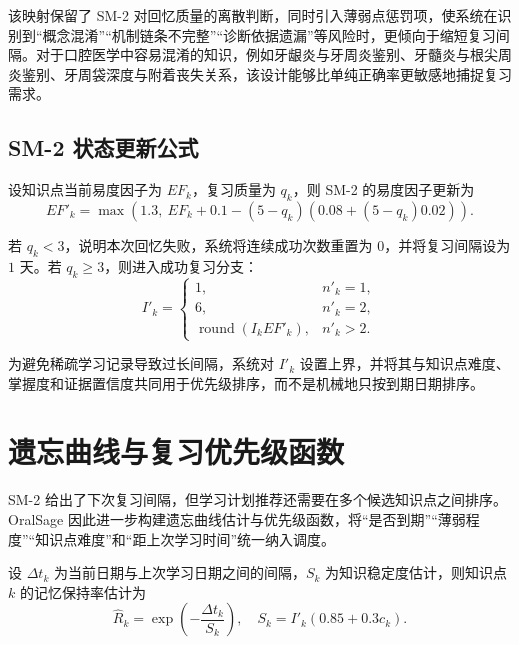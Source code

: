 该映射保留了 SM-2 对回忆质量的离散判断，同时引入薄弱点惩罚项，使系统在识别到“概念混淆”“机制链条不完整”“诊断依据遗漏”等风险时，更倾向于缩短复习间隔。对于口腔医学中容易混淆的知识，例如牙龈炎与牙周炎鉴别、牙髓炎与根尖周炎鉴别、牙周袋深度与附着丧失关系，该设计能够比单纯正确率更敏感地捕捉复习需求。

\subsection{SM-2 状态更新公式}

设知识点当前易度因子为 $EF_k$，复习质量为 $q_k$，则 SM-2 的易度因子更新为
\begin{equation}
  EF'_k = \max\left(1.3,\ EF_k + 0.1 - (5-q_k)\left(0.08+(5-q_k)0.02\right)\right).
  \label{eq:sm2-ef}
\end{equation}

若 $q_k<3$，说明本次回忆失败，系统将连续成功次数重置为 $0$，并将复习间隔设为 $1$ 天。若 $q_k\ge3$，则进入成功复习分支：
\begin{equation}
  I'_k =
  \begin{cases}
  1, & n'_k=1,\\
  6, & n'_k=2,\\
  \operatorname{round}(I_k EF'_k), & n'_k>2.
  \end{cases}
  \label{eq:sm2-interval}
\end{equation}

为避免稀疏学习记录导致过长间隔，系统对 $I'_k$ 设置上界，并将其与知识点难度、掌握度和证据置信度共同用于优先级排序，而不是机械地只按到期日期排序。

\section{遗忘曲线与复习优先级函数}

SM-2 给出了下次复习间隔，但学习计划推荐还需要在多个候选知识点之间排序。OralSage 因此进一步构建遗忘曲线估计与优先级函数，将“是否到期”“薄弱程度”“知识点难度”和“距上次学习时间”统一纳入调度。

设 $\Delta t_k$ 为当前日期与上次学习日期之间的间隔，$S_k$ 为知识稳定度估计，则知识点 $k$ 的记忆保持率估计为
\begin{equation}
  \hat R_k = \exp\left(-\frac{\Delta t_k}{S_k}\right),
  \quad
  S_k = I'_k(0.85+0.3c_k).
  \label{eq:retention-estimate}
\end{equation}

